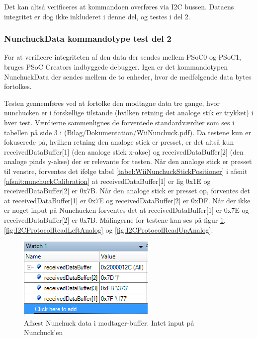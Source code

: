 \noindent Det kan altså verificeres at kommandoen overføres via I2C bussen. Dataens integritet er dog ikke inkluderet i denne del, og testes i del 2.

\subsubsection{NunchuckData kommandotype test del 2}
For at verificere integriteten af den data der sendes mellem PSoC0 og PSoC1, bruges PSoC Creators indbyggede debugger. Igen er det kommandotypen NunchuckData der sendes mellem de to enheder, hvor de medfølgende data bytes fortolkes. \newline

\noindent Testen gennemføres ved at fortolke den modtagne data tre gange, hvor nunchucken er i forskellige tilstande (hvilken retning det analoge stik er trykket) i hver test. Værdierne sammenlignes de forventede standardværdier som ses i tabellen på side 3 i (Bilag/Dokumentation/WiiNunchuck.pdf). Da testene kun er fokuserede på, hvilken retning den analoge stick er presset, er det altså kun receivedDataBuffer[1] (den analoge stick x-akse) og receivedDataBuffer[2] (den analoge pinds y-akse) der er relevante for testen. Når den analoge stick er presset til venstre, forventes det ifølge tabel \ref{tabel:WiiNunchuckStickPositioner} i afsnit \ref{afsnit:nunchuckCalibration} at receivedDataBuffer[1] er lig 0x1E og receivedDataBuffer[2] er 0x7B. Når den analoge stick er presset op, forventes det at receivedDataBuffer[1] er 0x7E og receivedDataBuffer[2] er 0xDF. Når der ikke er noget input på Nunchucken forventes det at receivedDataBuffer[1] er 0x7E og receivedDataBuffer[2] er 0x7B. Målingerne for testene kan ses på figur \ref{fig:I2CProtocolReadNoInput}, \ref{fig:I2CProtocolReadLeftAnalog} og \ref{fig:I2CProtocolReadUpAnalog}.

\begin{figure}[H]
	\centering
	\includegraphics[width=.5\textwidth]{Test/images/I2CProtocolReadNoInput.png}
	\caption{Aflæst Nunchuck data i modtager-buffer. Intet input på Nunchuck'en}
	\label{fig:I2CProtocolReadNoInput}
\end{figure}

